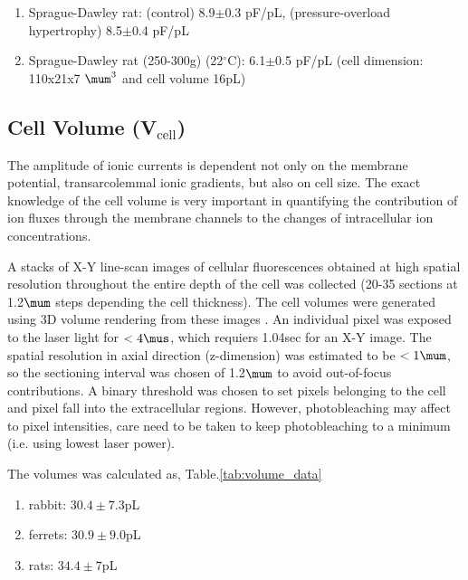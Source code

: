 \begin{enumerate}
  \item Sprague-Dawley rat: (control) 8.9$\pm$0.3 pF/pL,
  (pressure-overload hypertrophy) 8.5$\pm$0.4 pF/pL
  
  \item Sprague-Dawley rat (250-300g) (22$^\circ$C):
  6.1$\pm$0.5 pF/pL (cell dimension: 110x21x7 $\mum^3$ and
  cell volume 16pL) \citep{Bouchard1995}
\end{enumerate}

\subsection{Cell Volume (V$_\text{cell}$)}
\label{sec:volume-surf-relat}

The amplitude of ionic currents is dependent not only on the membrane potential,
transarcolemmal ionic gradients, but also on cell size. The exact knowledge of
the cell volume is very important in quantifying the contribution of ion fluxes
through the membrane channels to the changes of intracellular ion
concentrations. 

A stacks of X-Y line-scan images of cellular fluorescences obtained at high
spatial resolution throughout the entire depth of the cell was collected (20-35
sections at 1.2$\mum$ steps depending the cell thickness).
The cell volumes were generated using 3D volume rendering from these images
\citep{satoh1996svr}. An individual pixel was exposed to the laser light for $<
4\mus$, which requiers 1.04sec for an X-Y image. The spatial resolution in axial
direction (z-dimension) was estimated to be $<1\mum$, so the sectioning interval
was chosen of 1.2$\mum$ to avoid out-of-focus contributions. A binary threshold
was chosen to set pixels belonging to the cell and pixel fall into the
extracellular regions. However, photobleaching may affect to pixel intensities,
care need to be taken to keep photobleaching to a minimum (i.e. using lowest
laser power).

The volumes was calculated as, Table.\ref{tab:volume_data}
\begin{enumerate}
\item rabbit: $30.4\pm 7.3$pL
\item ferrets: $30.9\pm 9.0$pL
\item rats: $34.4\pm 7$pL
\end{enumerate}

